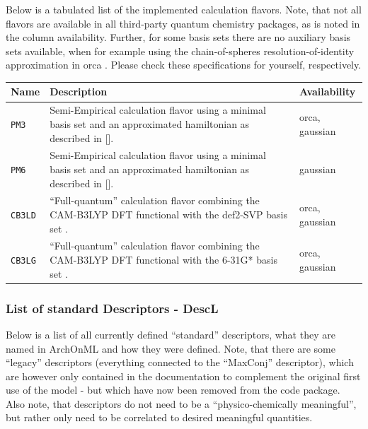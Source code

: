 \documentclass[12pt]{achemso}
\begin{document}
Below is a tabulated list of the implemented calculation flavors. Note, that not all flavors are available in all third-party quantum chemistry packages, as is noted in the column availability. Further, for some basis sets there are no auxiliary basis sets available, when for example using the chain-of-spheres resolution-of-identity approximation in orca \cite{NEESE200998}. Please check these specifications for yourself, respectively.

\begin{table}[h!]
    \centering
    \begin{tabular}{p{4cm} | p{8cm} | p{4cm}}
    \hline
    \textbf{Name} &  \textbf{Description}  & \textbf{Availability}\\
    \hline
    \hline

    \verb+PM3+ & Semi-Empirical calculation flavor using a minimal basis set and an approximated hamiltonian as described in [\cite{Stewart_PM3}]. & orca, gaussian\\
    \hline

    \verb+PM6+ & Semi-Empirical calculation flavor using a minimal basis set and an approximated hamiltonian as described in [\cite{Stewart_PM6}]. & gaussian\\
    \hline

    \verb+CB3LD+ & ``Full-quantum'' calculation flavor combining the CAM-B3LYP DFT functional\cite{YANAI200451} with the def2-SVP basis set \cite{B508541A}. & orca, gaussian\\
    \hline

    \verb+CB3LG+ & ``Full-quantum'' calculation flavor combining the CAM-B3LYP DFT functional\cite{YANAI200451} with the 6-31G* basis set \cite{Ditchfield_1971}. & orca, gaussian\\
    \hline

    \end{tabular}
\end{table}

\subsubsection{List of standard Descriptors - DescL}

\noindent Below is a list of all currently defined ``standard'' descriptors, what they are named in ArchOnML and how they were defined. Note, that there are some ``legacy'' descriptors (everything connected to the ``MaxConj'' descriptor), which are however only contained in the documentation to complement the original first use of the model - but which have now been removed from the code package. Also note, that descriptors do not need to be a ``physico-chemically meaningful'', but rather only need to be correlated to desired meaningful quantities.
\end{document}
